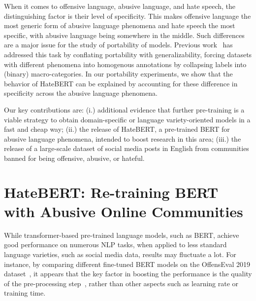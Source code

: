 \documentclass[11pt]{article}
\begin{document}
When it comes to offensive language, abusive language, and hate speech, the distinguishing factor is their level of specificity. This makes offensive language the most generic form of abusive language phenomena and hate speech the most specific, with abusive language being somewhere in the middle. Such differences are a major issue for the study of portability of models.  Previous work~\cite{karan-snajder-2018-cross,benk2019data,pamungkas2019cross,rizoiu2019transfer} has addressed this task by conflating portability with generalizability, forcing datasets with different phenomena into homogenous annotations by collapsing labels into (binary) macro-categories. In our portability experiments, we show that the behavior of HateBERT can be explained by accounting for these difference in specificity across the abusive language phenomena. 

Our key contributions are: (i.) additional evidence that further pre-training is a viable strategy to obtain domain-specific or language variety-oriented models in a fast and cheap way; (ii.) the release of HateBERT, a pre-trained BERT for abusive language phenomena, intended to boost research in this area; (iii.) the release of a large-scale dataset of social media posts in English from communities banned for being offensive, abusive, or hateful.

\section{HateBERT: Re-training BERT with Abusive Online Communities}

While transformer-based pre-trained language models, such as BERT, achieve good performance on numerous NLP tasks, when applied to less standard language varieties, such as social media data, results may fluctuate a lot. For instance, by comparing different fine-tuned BERT models on the OffensEval 2019 dataset~\cite{zampieri-etal-2019-semeval}, it appears that the key factor in boosting the performance is the quality of the pre-processing step~\cite{liu-etal-2019-nuli,swamy-etal-2019-studying}, rather than other aspects such as learning rate or training time. 
\end{document}
